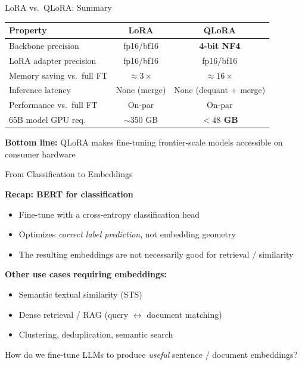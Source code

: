\documentclass[11pt,compress,t,notes=noshow, xcolor=table]{beamer}
\begin{document}
\begin{frame}{LoRA vs.\ QLoRA: Summary}

\vfill

\renewcommand{\arraystretch}{1.4}
\begin{tabular}{lcc}
\hline
\textbf{Property} & \textbf{LoRA} & \textbf{QLoRA} \\
\hline
Backbone precision & fp16/bf16 & \textbf{4-bit NF4} \\
LoRA adapter precision & fp16/bf16 & fp16/bf16 \\
Memory saving vs.\ full FT & $\approx 3\times$ & $\approx 16\times$ \\
Inference latency & None (merge) & None (dequant + merge) \\
Performance vs.\ full FT & On-par & On-par \\
65B model GPU req. & $\sim$350 GB & \textbf{$< 48$ GB} \\
\hline
\end{tabular}

\vfill

\textbf{Bottom line:} QLoRA makes fine-tuning frontier-scale models accessible on consumer hardware

\vfill

\end{frame}


\begin{frame}{From Classification to Embeddings}

\vfill

\textbf{Recap: BERT for classification}
\begin{itemize}
  \item Fine-tune with a cross-entropy classification head
  \item Optimizes \textit{correct label prediction}, not embedding geometry
  \item The resulting embeddings are not necessarily good for retrieval / similarity
\end{itemize}

\vfill

\textbf{Other use cases requiring embeddings:}
\begin{itemize}
  \item Semantic textual similarity (STS)
  \item Dense retrieval / RAG (query $\leftrightarrow$ document matching)
  \item Clustering, deduplication, semantic search
\end{itemize}

\vfill

\ques How do we fine-tune LLMs to produce \textit{useful} sentence / document embeddings?

\vfill

\end{frame}
\end{document}
